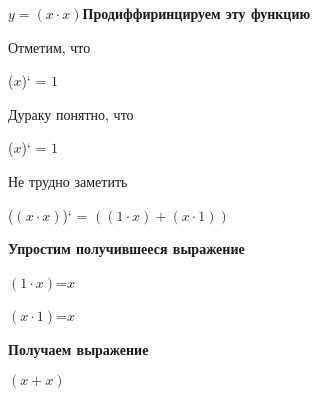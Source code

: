 \documentclass[12pt,a4paper,fleqn]{article}
\begin{document}
$y = $$(x \cdot x)$\newpage \textbf{\Huge Продиффиринцируем эту функцию}

Отметим, что

\begin{center}
($x$)`
 = $1$\end{center}
Дураку понятно, что

\begin{center}
($x$)`
 = $1$\end{center}
Не трудно заметить

\begin{center}
($(x \cdot x)$)`
 = $((1 \cdot x) + (x \cdot 1))$\end{center}
\newpage \textbf{\LARGE Упростим получившееся выражение}

\begin{center}
$(1 \cdot x)$=$x$\end{center}
\begin{center}
$(x \cdot 1)$=$x$\end{center}
\newpage \textbf{\Huge Получаем выражение}

$(x + x)$
\end{document}
